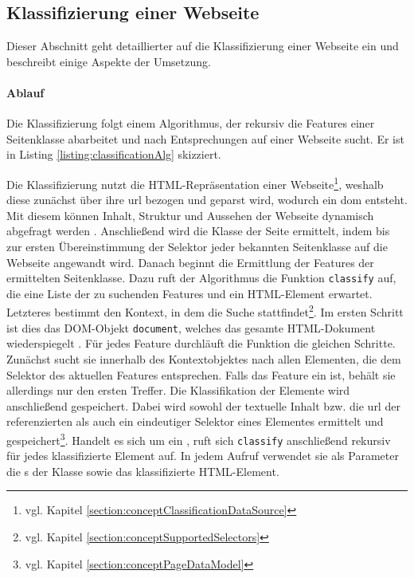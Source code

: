 \subsection{Klassifizierung einer Webseite}
    \label{section:solutionDetailsClassificationServiceClassification}
    Dieser Abschnitt geht detaillierter auf die Klassifizierung einer Webseite ein
    und beschreibt einige Aspekte der Umsetzung.

    \paragraph{Ablauf}
    Die Klassifizierung folgt einem Algorithmus,
    der rekursiv die Features einer Seitenklasse abarbeitet und nach Entsprechungen
    auf einer Webseite sucht.
    Er ist in Listing \ref{listing:classificationAlg} skizziert.

    

    Die Klassifizierung nutzt die HTML-Repräsentation einer
    Webseite\footnote{vgl. Kapitel \ref{section:conceptClassificationDataSource}},
    weshalb diese zunächst über ihre \gls{url} bezogen und geparst wird,
    wodurch ein \gls{dom} entsteht.
    Mit diesem können Inhalt, Struktur und Aussehen der Webseite
    dynamisch abgefragt werden \cite{w3c:dom}.
    Anschließend wird die Klasse der Seite ermittelt,
    indem bis zur ersten Übereinstimmung der Selektor jeder bekannten
    Seitenklasse auf die Webseite angewandt wird.
    Danach beginnt die Ermittlung der Features der ermittelten Seitenklasse.
    Dazu ruft der Algorithmus die Funktion \texttt{classify} auf,
    die eine Liste der zu suchenden Features und ein HTML-Element erwartet.
    Letzteres bestimmt den Kontext, in dem die Suche stattfindet\footnote{vgl. Kapitel \ref{section:conceptSupportedSelectors}}.
    Im ersten Schritt ist dies das DOM-Objekt \texttt{document},
    welches das gesamte HTML-Dokument wiederspiegelt \cite[Kapitel 1.4]{w3c:dom}.
    Für jedes Feature durchläuft die Funktion die gleichen Schritte.
    Zunächst sucht sie innerhalb des Kontextobjektes nach allen Elementen,
    die dem Selektor des aktuellen Features entsprechen.
    Falls das Feature ein {\scalarFeature} ist, behält sie allerdings nur den ersten Treffer.
    Die Klassifikation der Elemente wird anschließend gespeichert.
    Dabei wird sowohl der textuelle Inhalt bzw. die \gls{url}
    der referenzierten {\resource} als auch ein eindeutiger Selektor eines Elementes ermittelt
    und gespeichert\footnote{vgl. Kapitel \ref{section:conceptPageDataModel}}.
    Handelt es sich um ein {\collectionFeature}, ruft sich \texttt{classify} anschließend rekursiv für jedes klassifizierte Element auf.
    In jedem Aufruf verwendet sie als Parameter die {\childFeature}s der Klasse sowie das klassifizierte HTML-Element.

